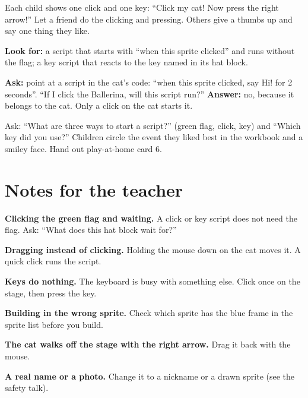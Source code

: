 \begin{teacherscript}
Each child shows one click and one key: \enquote{Click my cat! Now press the right arrow!} Let a friend do the clicking and pressing. Others give a thumbs up and say one thing they like.
\end{teacherscript}

\begin{formativecheck}
\textbf{Look for:} a script that starts with \enquote{when this sprite clicked} and runs without the flag; a key script that reacts to the key named in its hat block.

\textbf{Ask:} point at a script in the cat's code: \enquote{when this sprite clicked, say Hi! for 2 seconds}. \enquote{If I click the Ballerina, will this script run?}
\textbf{Answer:} no, because it belongs to the cat. Only a click on the cat starts it.
\end{formativecheck}

\begin{reflection}
Ask: \enquote{What are three ways to start a script?} (green flag, click, key) and \enquote{Which key did you use?} Children circle the event they liked best in the workbook and a smiley face. Hand out play-at-home card 6.
\end{reflection}

\section{Notes for the teacher}
\begin{commonmistakes}
  \item \textbf{Clicking the green flag and waiting.} A click or key script does not need the flag. Ask: \enquote{What does this hat block wait for?}
  \item \textbf{Dragging instead of clicking.} Holding the mouse down on the cat moves it. A quick click runs the script.
  \item \textbf{Keys do nothing.} The keyboard is busy with something else. Click once on the stage, then press the key.
  \item \textbf{Building in the wrong sprite.} Check which sprite has the blue frame in the sprite list before you build.
  \item \textbf{The cat walks off the stage with the right arrow.} Drag it back with the mouse.
  \item \textbf{A real name or a photo.} Change it to a nickname or a drawn sprite (see the safety talk).
\end{commonmistakes}

